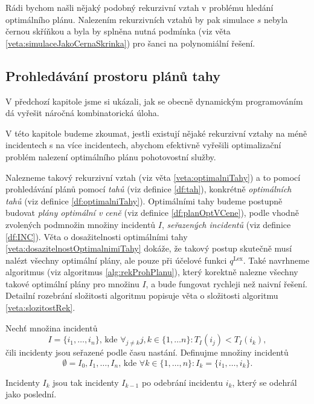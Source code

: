 Rádi bychom našli nějaký podobný rekurzivní vztah v problému hledání optimálního plánu.
Nalezením rekurzivních vztahů by pak simulace $s$ nebyla černou skříňkou a byla by splněna nutná podmínka (viz věta \ref{veta:simulaceJakoCernaSkrinka}) pro šanci na polynomiální řešení.

\subsection{Prohledávání prostoru plánů tahy}

V předchozí kapitole jsme si ukázali, jak se obecně dynamickým programováním dá 
vyřešit náročná kombinatorická úloha.

V této kapitole budeme zkoumat, jestli existují nějaké rekurzivní vztahy 
 na méně incidentech s  na více incidentech, abychom efektivně vyřešili optimalizační problém nalezení optimálního plánu pohotovostní služby. 

Nalezneme takový rekurzivní vztah (viz věta \ref{veta:optimalniTahy}) a to pomocí prohledávání plánů pomocí \textit{tahů} (viz definice \ref{df:tah}),
konkrétně \textit{optimálních tahů} (viz definice \ref{df:optimalniTahy}).
Optimálními tahy budeme postupně budovat \textit{plány optimální v ceně} (viz definice \ref{df:planOptVCene}),
podle vhodně zvolených podmnožin množiny incidentů $I$, \textit{seřazených incidentů} (viz definice \ref{df:INC}).
Věta o dosažitelnosti optimálními tahy \ref{veta:dosazitelnostOptimalnimiTahy} dokáže, že takový postup skutečně musí nalézt všechny optimální plány, ale pouze při účelové funkci $q^{\text{Lex}}$.
Také navrhneme algoritmus (viz algoritmus \ref{alg:rekProhPlanu}),
který korektně nalezne všechny takové optimální plány pro množinu $I$, a bude fungovat rychleji než naivní řešení.
Detailní rozebrání složitosti algoritmu popisuje věta o složitosti algoritmu \ref{veta:slozitostRek}.

\begin{definice}\label{df:INC}
  Nechť množina incidentů 
  \begin{equation*}
    I = \{ i_1, \dots , i_n \} \text{, kde } \forall_{j \not = k} j, k \in \{ 1, \dots n\} \colon T_I(i_j) < T_I(i_k),
  \end{equation*}
  čili incidenty jsou seřazené podle času nastání.
  Definujme množiny incidentů
  \begin{equation*}
    \emptyset = I_0, I_1, \dots, I_n \text{, kde } \forall k \in \{ 1, \dots, n \} \colon I_k = \{ i_1, \dots, i_k \}.
  \end{equation*}

  Incidenty $I_k$ jsou tak incidenty $I_{k-1}$ po odebrání incidentu $i_k$, který se odehrál jako poslední.
\end{definice}

